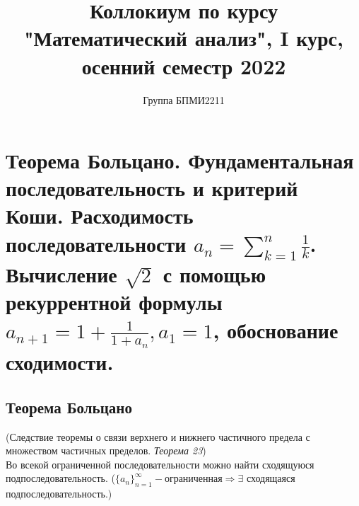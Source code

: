 \documentclass[12pt]{article}
\title{Коллокиум по курсу "Математический анализ", I курс, осенний семестр 2022}
\author{Группа БПМИ2211}
\begin{document}
\maketitle

\section{Теорема Больцано. Фундаментальная последовательность и критерий Коши. Расходимость последовательности $a_n = \sum^n_{k=1}\frac{1}{k}$. Вычисление $\sqrt{2}$ с помощью рекуррентной формулы $a_{n+1} = 1 + \frac{1}{1+a_n}, a_1 = 1$, обоснование сходимости.}
\subsection{Теорема Больцано}
(Следствие теоремы о связи верхнего и нижнего частичного предела с множеством частичных пределов. \textit{Теорема 23}) \\ 
Во всекой ограниченной последовательности можно найти сходящуюся подпоследовательность. ($\{a_n\}^{\infty}_{n=1}-\text{ограниченная} \Rightarrow \exists$ сходящаяся подпоследовательность.)
\end{document}
